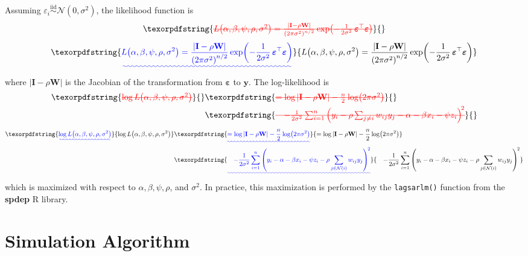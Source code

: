 \documentclass{article}[11pt]
\makeatletter
\providecommand{\DIFaddtex}[1]{{\protect\color{blue}\uwave{#1}}} %
\providecommand{\DIFdeltex}[1]{{\protect\color{red}\sout{#1}}} %
\providecommand{\DIFaddbegin}{} %
\providecommand{\DIFaddend}{} %
\providecommand{\DIFdelbegin}{} %
\providecommand{\DIFdelend}{} %
\providecommand{\DIFadd}[1]{\texorpdfstring{\DIFaddtex{#1}}{#1}} %
\providecommand{\DIFdel}[1]{\texorpdfstring{\DIFdeltex{#1}}{}} %
\providecommand{\DIFscaledelfig}{0.5}
\newlength{\DIFdelgraphicswidth} %
\newlength{\DIFdelgraphicsheight} %
\providecommand{\DIFaddincludegraphics}[2][]{{\color{blue}\fbox{\DIFOincludegraphics[#1]{#2}}}} %
\providecommand{\DIFdelincludegraphics}[2][]{%
\sbox{\DIFdelgraphicsbox}{\DIFOincludegraphics[#1]{#2}}%
\settoboxwidth{\DIFdelgraphicswidth}{\DIFdelgraphicsbox} %
\settoboxtotalheight{\DIFdelgraphicsheight}{\DIFdelgraphicsbox} %
\scalebox{\DIFscaledelfig}{%
\parbox[b]{\DIFdelgraphicswidth}{\usebox{\DIFdelgraphicsbox}\\[-\baselineskip] \rule{\DIFdelgraphicswidth}{0em}}\llap{\resizebox{\DIFdelgraphicswidth}{\DIFdelgraphicsheight}{%
\setlength{\unitlength}{\DIFdelgraphicswidth}%
\begin{picture}(1,1)%
\thicklines\linethickness{2pt} %
{\color[rgb]{1,0,0}\put(0,0){\framebox(1,1){}}}%
{\color[rgb]{1,0,0}\put(0,0){\line( 1,1){1}}}%
{\color[rgb]{1,0,0}\put(0,1){\line(1,-1){1}}}%
\end{picture}%
}\hspace*{3pt}}} %
} %
\DeclareRobustCommand{\DIFaddbegin}{\DIFOaddbegin \let\includegraphics\DIFaddincludegraphics} %
\DeclareRobustCommand{\DIFaddend}{\DIFOaddend \let\includegraphics\DIFOincludegraphics} %
\DeclareRobustCommand{\DIFdelbegin}{\DIFOdelbegin \let\includegraphics\DIFdelincludegraphics} %
\DeclareRobustCommand{\DIFdelend}{\DIFOaddend \let\includegraphics\DIFOincludegraphics} %
\let\sout@orig\sout %
\renewcommand{\sout}[1]{\ifmmode\text{\sout@orig{\ensuremath{#1}}}\else\sout@orig{#1}\fi} %
\makeatother
\begin{document}
Assuming $\varepsilon_i \overset{\text{iid}}{\sim} \mathcal{N}(0,\sigma^2)$, the likelihood function is
\DIFdelbegin \begin{displaymath}
    \DIFdel{L\!\left(\alpha,\beta,\psi,\rho,\sigma^2\right)
    = \frac{|\mathbf{I} - \rho\mathbf{W}|}{\left(2\pi\sigma^2\right)^{n/2}}
      \exp\!\left(-\frac{1}{2\sigma^2}\,\boldsymbol{\varepsilon}^{\top}\boldsymbol{\varepsilon}\right)
}\end{displaymath}%
\DIFdelend \DIFaddbegin \begin{equation*}
    \DIFadd{L\!\left(\alpha,\beta,\psi,\rho,\sigma^2\right)
    = \frac{|\mathbf{I} - \rho\mathbf{W}|}{\left(2\pi\sigma^2\right)^{n/2}}
      \exp\!\left(-\frac{1}{2\sigma^2}\,\boldsymbol{\varepsilon}^{\top}\boldsymbol{\varepsilon}\right)
}\end{equation*}\DIFaddend 
where $|\mathbf{I}-\rho\mathbf{W}|$ is the Jacobian of the transformation from $\boldsymbol{\varepsilon}$ to $\mathbf{y}$. The log-likelihood is
\DIFdelbegin \begin{align*}
    \DIFdel{\log L\!\left(\alpha,\beta,\psi,\rho,\sigma^2\right)
    }&\DIFdel{= \log|\mathbf{I} - \rho\mathbf{W}|
       - \frac{n}{2}\log\!\left(2\pi\sigma^2\right) \notag }\\
    &\DIFdel{\quad - \frac{1}{2\sigma^2}
        \sum_{i=1}^{n}
        \left(y_i - \rho\sum_{j \neq i}w_{ij}y_j - \alpha - \beta x_i - \psi z_i\right)^{\!2}
}\end{align*}%
\DIFdelend \DIFaddbegin \begin{align*}
    \DIFadd{\log L\!\left(\alpha,\beta,\psi,\rho,\sigma^2\right)
    }&\DIFadd{= \log|\mathbf{I} - \rho\mathbf{W}|
       - \frac{n}{2}\log\!\left(2\pi\sigma^2\right) \notag }\\
    &\DIFadd{\quad - \frac{1}{2\sigma^2}
        \sum_{i=1}^{n}
        \left(y_i - \alpha - \beta x_i - \psi z_i - \rho\sum_{j \in \mathcal{N}(i)}w_{ij}y_j\right)^{\!2}
}\end{align*}\DIFaddend 
which is maximized with respect to $\alpha, \beta, \psi, \rho$, and $\sigma^2$. In practice, this maximization is performed by the \texttt{lagsarlm()} function from the \textbf{spdep} R library\cite{bivand_r_2022}.

\section{Simulation Algorithm}\label{appendix:SimAlgorithm}
\end{document}
